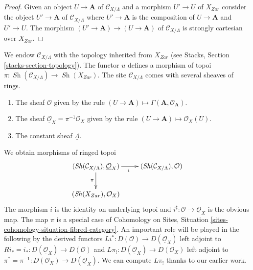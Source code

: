 \documentclass{stacks-project}
\theoremstyle{plain}
\theoremstyle{definition}
\theoremstyle{remark}
\numberwithin{equation}{subsection}
\def\Sh{\mathop{\mathit{Sh}}\nolimits}
\begin{document}
\begin{proof}
Given an object $U \to \mathbf{A}$ of $\mathcal{C}_{X/\Lambda}$ and a morphism
$U' \to U$ of $X_{Zar}$ consider the object $U' \to \mathbf{A}$ of
$\mathcal{C}_{X/\Lambda}$ where $U' \to \mathbf{A}$ is the composition of
$U \to \mathbf{A}$ and $U' \to U$. The morphism
$(U' \to \mathbf{A}) \to (U \to \mathbf{A})$ of
$\mathcal{C}_{X/\Lambda}$ is strongly cartesian over $X_{Zar}$.
\end{proof}

\noindent
We endow $\mathcal{C}_{X/\Lambda}$ with the topology inherited from
$X_{Zar}$ (see Stacks, Section \ref{stacks-section-topology}).
The functor $u$ defines a morphism of topoi
$\pi : \Sh(\mathcal{C}_{X/\Lambda}) \to \Sh(X_{Zar})$.
The site $\mathcal{C}_{X/\Lambda}$ comes with several sheaves of rings.
\begin{enumerate}
\item The sheaf $\mathcal{O}$ given by the rule
$(U \to \mathbf{A}) \mapsto \Gamma(\mathbf{A}, \mathcal{O}_\mathbf{A})$.
\item The sheaf $\underline{\mathcal{O}}_X = \pi^{-1}\mathcal{O}_X$ given by
the rule $(U \to \mathbf{A}) \mapsto \mathcal{O}_X(U)$.
\item The constant sheaf $\underline{\Lambda}$.
\end{enumerate}
We obtain morphisms of ringed topoi
\begin{equation}
\label{equation-pi-schemes}
\vcenter{
\xymatrix{
(\Sh(\mathcal{C}_{X/\Lambda}), \underline{\mathcal{O}}_X) \ar[r]_i \ar[d]_\pi &
(\Sh(\mathcal{C}_{X/\Lambda}), \mathcal{O}) \\
(\Sh(X_{Zar}), \mathcal{O}_X)
}
}
\end{equation}
The morphism $i$ is the identity on underlying topoi and
$i^\sharp : \mathcal{O} \to \underline{\mathcal{O}}_X$
is the obvious map.
The map $\pi$ is a special case of Cohomology on Sites, Situation
\ref{sites-cohomology-situation-fibred-category}.
An important role will be played in the following
by the derived functors
$
Li^* : D(\mathcal{O}) \longrightarrow D(\underline{\mathcal{O}}_X)
$
left adjoint to $Ri_* = i_* : D(\underline{\mathcal{O}}_X) \to D(\mathcal{O})$
and
$
L\pi_! : D(\underline{\mathcal{O}}_X) \longrightarrow D(\mathcal{O}_X)
$
left adjoint to
$\pi^* = \pi^{-1} : D(\mathcal{O}_X) \to D(\underline{\mathcal{O}}_X)$.
We can compute $L\pi_!$ thanks to our earlier work.
\end{document}
